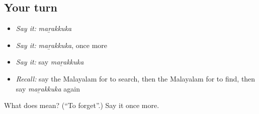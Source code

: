 \subsection*{Your turn}
\begin{itemize}
\raggedright
  \item \emph{Say it:} \emph{maṟakkuka}
  \item \emph{Say it:} \emph{maṟakkuka}, once more
  \item \emph{Say it:} say \emph{maṟakkuka}
  \item \emph{Recall:} say the Malayalam for to search, then the Malayalam for to find, then say \emph{maṟakkuka} again
\end{itemize}

\begin{tcolorbox}[breakable,colback=teal!4,colframe=teal!35!black,title={Before you move on}]
What does  mean? (\textquotedblleft{}To forget\textquotedblright{}.) Say it once more.
\end{tcolorbox}

